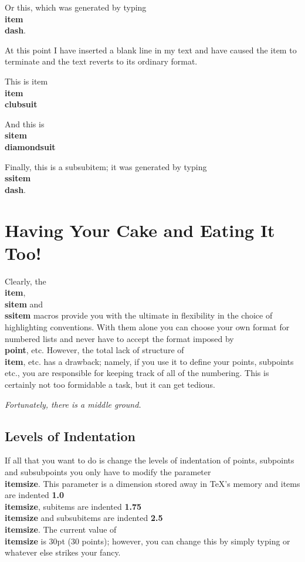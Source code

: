 \item\dash
Or this, which was generated by typing {\bf \\item\\dash}.
 
At this point I have inserted a blank line in my text and have
caused the item to terminate and the text reverts to its ordinary
format.
 
\item\clubsuit
This is item {\bf \\item\\clubsuit}
 
\sitem\diamondsuit
And this is {\bf \\sitem\\diamondsuit}
 
\ssitem\dash
Finally, this is a subsubitem; \nextline
it was generated by typing
{\bf \\ssitem\\dash}.
 
\section{Having Your Cake and Eating It Too!}
 
Clearly, the {\bf \\item},{\bf \\sitem} and {\bf \\ssitem}
macros provide you with the ultimate in flexibility
in the choice of highlighting conventions.
With them alone you can choose your own format for numbered lists
and never have to accept the format imposed by {\bf \\point}, etc.
However, the total lack of structure of {\bf \\item}, etc.
has a drawback; namely, if you use it to define your points, subpoints
etc., you are responsible for keeping track of all of the numbering.
This is certainly not too
formidable a task, but it can get tedious. \nextline
\centerline{\it  Fortunately,  there is a middle ground.}
 
\subsection{Levels of Indentation}
 
If all that you want to do is change the levels of indentation
of points, subpoints and subsubpoints you only have to modify
the parameter {\bf \\itemsize}.
This parameter is a dimension stored away in \TeX 's memory
and items are indented {\bf 1.0\\itemsize}, subitems are indented
{\bf 1.75\\itemsize} and subsubitems are indented {\bf 2.5\\itemsize}.
The current value of {\bf \\itemsize} is 30pt (30 points);
however, you can change this by simply typing
\tc{\\itemsize = \it 40pt}
or whatever else strikes your fancy.
 
